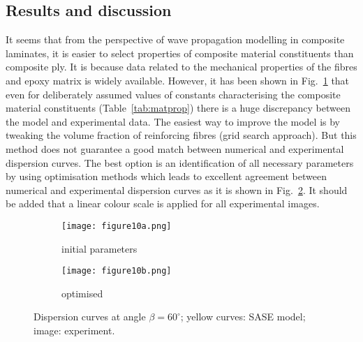 \documentclass[preprint,12pt]{elsarticle}
\begin{document}
	\subsection{Results and discussion}
It seems that from the perspective of wave propagation modelling in composite laminates, it is easier to select properties of composite material constituents than composite ply. It is because data related to the mechanical properties of the fibres and epoxy matrix is widely available. However, it has been shown in Fig.~\ref{fig:dispersion60deg_initial} that even for deliberately assumed values of constants characterising the composite material constituents (Table~\ref{tab:matprop}) there is a huge discrepancy between the model and experimental data. The easiest way to improve the model is by tweaking the volume fraction of reinforcing fibres (grid search approach). But this method does not guarantee a good match between numerical and experimental dispersion curves. The best option is an identification of all necessary parameters by using optimisation methods which leads to excellent agreement between numerical and experimental dispersion curves as it is shown in Fig.~\ref{fig:dispersion60deg}. It should be added that a linear colour scale is applied for all experimental images.
	\begin{figure} [h!]
		\centering
		\begin{subfigure}[b]{0.49\textwidth}
			\centering
		   \texttt{[image: figure10a.png]}
			\caption{initial parameters}
			\label{fig:dispersion60deg_initial}
		\end{subfigure}
		\begin{subfigure}[b]{0.49\textwidth}
			\centering
			\texttt{[image: figure10b.png]}
			\caption{optimised}
			\label{fig:dispersion60deg}
		\end{subfigure}
	\caption{Dispersion curves at angle \(\beta = 60^{\circ}\); yellow curves: SASE 
	model; 
	image: experiment. }
	\label{fig:initial_optimized}
	\end{figure}
\end{document}
